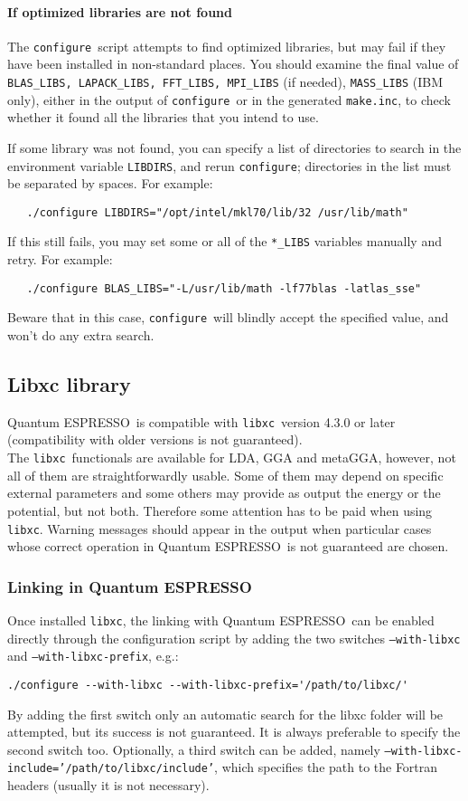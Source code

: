 \documentclass[12pt,a4paper]{article}
\def\qe{{\sc Quantum ESPRESSO}}
\def\configure{\texttt{configure}}
\def\libxc{\texttt{libxc}}
\begin{document}
\paragraph{If optimized libraries are not found}
The \configure\ script attempts to find optimized libraries, but may fail
if they have been installed in non-standard places. You should examine
the final value of \texttt{BLAS\_LIBS, LAPACK\_LIBS, FFT\_LIBS, MPI\_LIBS} (if needed),
\texttt{MASS\_LIBS} (IBM only), either in the output of \configure\ or in the generated
\texttt{make.inc}, to check whether it found all the libraries that you intend to use.

If some library was not found, you can specify a list of directories to search
in the environment variable \texttt{LIBDIRS},
and rerun \configure; directories in the
list must be separated by spaces. For example:
\begin{verbatim}
   ./configure LIBDIRS="/opt/intel/mkl70/lib/32 /usr/lib/math"
\end{verbatim}
If this still fails, you may set some or all of the \texttt{*\_LIBS} variables manually
and retry. For example:
\begin{verbatim}
   ./configure BLAS_LIBS="-L/usr/lib/math -lf77blas -latlas_sse"
\end{verbatim}
Beware that in this case, \configure\ will blindly accept the specified value,
and won't do any extra search.

\subsection{Libxc library}

\qe\ is compatible with \libxc\ version 4.3.0 or later (compatibility with older versions is not guaranteed).\\
The \libxc\ functionals are available for LDA, GGA and metaGGA, however, not all of them are straightforwardly usable. Some of them may depend on specific external parameters and some others may provide as output the energy or the potential, but not both. Therefore some attention has to be paid when using \libxc. Warning messages should appear in the output when particular cases whose correct operation in \qe\ is not guaranteed are chosen.

\subsubsection{Linking in \qe}
Once installed \libxc, the linking with \qe\ can be enabled directly through the configuration script by adding the two switches \texttt{--with-libxc} and \texttt{--with-libxc-prefix}, e.g.:
\begin{verbatim}
./configure --with-libxc --with-libxc-prefix='/path/to/libxc/'
\end{verbatim}
By adding the first switch only an automatic search for the libxc folder will be attempted, but its success is not guaranteed. It is always preferable to specify the second switch too. Optionally, a third switch can be added, namely \texttt{--with-libxc-include='/path/to/libxc/include'}, which specifies the path to the Fortran headers (usually it is not necessary).
\end{document}
